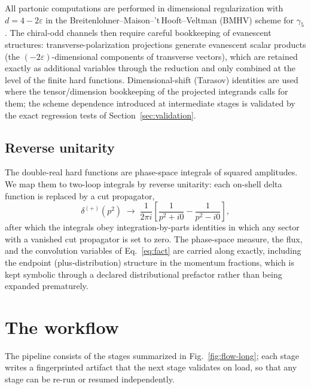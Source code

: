 \documentclass[11pt]{article}
\newcommand{\eps}{\varepsilon}
\begin{document}
All partonic computations are performed in dimensional regularization
with $d = 4 - 2\eps$ in the
Breitenlohner--Maison--'t\,Hooft--Veltman (BMHV) scheme for $\gamma_5$.
The chiral-odd channels then require careful bookkeeping of evanescent
structures: transverse-polarization projections generate evanescent
scalar products (the $(-2\eps)$-dimensional components of transverse
vectors), which are retained exactly as additional variables through
the reduction and only combined at the level of the finite hard
functions.  Dimensional-shift (Tarasov) identities are used where the
tensor/dimension bookkeeping of the projected integrands calls for
them; the scheme dependence introduced at intermediate stages is
validated by the exact regression tests of
Section~\ref{sec:validation}.

\subsection{Reverse unitarity}

The double-real hard functions are phase-space integrals of squared
amplitudes.  We map them to two-loop integrals by reverse unitarity:
each on-shell delta function is replaced by a cut propagator,
\begin{equation}
  \delta^{(+)}\!\left(p^2\right)
  \;\longrightarrow\;
  \frac{1}{2\pi i}
  \left[
    \frac{1}{p^2 + i0} - \frac{1}{p^2 - i0}
  \right],
\end{equation}
after which the integrals obey integration-by-parts identities in
which any sector with a vanished cut propagator is set to zero.  The
phase-space measure, the flux, and the convolution variables of
Eq.~\eqref{eq:fact} are carried along exactly, including the endpoint
(plus-distribution) structure in the momentum fractions, which is kept
symbolic through a declared distributional prefactor rather than being
expanded prematurely.

\section{The workflow}
\label{sec:workflow}

The pipeline consists of the stages summarized in
Fig.~\ref{fig:flow-long}; each stage writes a fingerprinted artifact
that the next stage validates on load, so that any stage can be re-run
or resumed independently.
\end{document}
